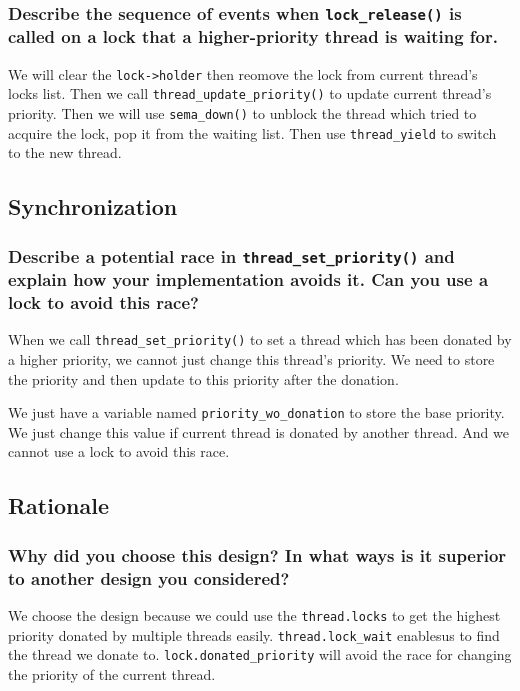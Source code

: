 \documentclass[sigconf, nonacm, balance=false, urlbreakonhyphens=true]{acmart}
\begin{document}
            \subsubsection{Describe the sequence of events when \texttt{lock\_release()} is called on a lock that a higher-priority thread is waiting for. }

                We will clear the \texttt{lock->holder} then reomove the lock from current thread's locks list. Then we call \texttt{thread\_update\_priority()} to update current thread's priority. Then we will use \texttt{sema\_down()} to unblock the thread which tried to acquire the lock, pop it from the waiting list. Then use \texttt{thread\_yield} to switch to the new thread. 

        \subsection{Synchronization}

            \subsubsection{Describe a potential race in \texttt{thread\_set\_priority()} and explain how your implementation avoids it.  Can you use a lock to avoid this race? }

                When we call \texttt{thread\_set\_priority()} to set a thread which has been donated by a higher priority, we cannot just change this thread's priority. We need to store the priority and then update to this priority after the donation.

                We just have a variable named \texttt{priority\_wo\_donation} to store the base priority. We just change this value if current thread is donated by another thread. And we cannot use a lock to avoid this race.

        \subsection{Rationale}

            \subsubsection{Why did you choose this design? In what ways is it superior to another design you considered? }

                We choose the design because we could use the \texttt{thread.locks} to get the highest priority donated by multiple threads easily. \texttt{thread.lock\_wait} enablesus to  find the thread we donate to. \texttt{lock.donated\_priority} will avoid the race for changing the priority of the current thread.
\end{document}
